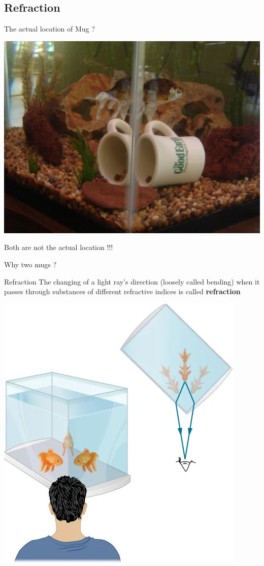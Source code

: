 \documentclass{beamer}
\begin{document}
\subsection{Refraction}
	\begin{frame}{The actual location of Mug ?}
		\begin{center}
			\includegraphics[scale=0.2]{23.jpeg}
		\end{center}
		\pause
		\begin{center}
			Both are not the actual location !!!
		\end{center}
	\end{frame}
	\begin{frame}{Why two mugs ?}
		\begin{block}{Refraction}
			The changing of a light ray’s direction (loosely called bending) when it passes through substances of different refractive indices is called \textbf{refraction}
		\end{block}
		\pause
		\begin{center}
			\includegraphics[scale=0.28]{24.png}
		\end{center}
	\end{frame}
\end{document}
